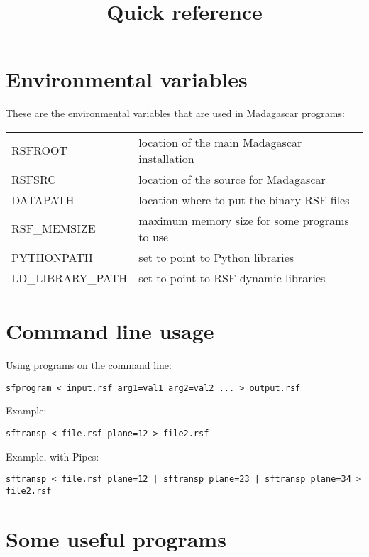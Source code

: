 \title{Quick reference}
\section{Environmental variables}

These are the environmental variables that are used in Madagascar programs:

\begin{tabular}{| l | l |}
    \hline
    RSFROOT & location of the main Madagascar installation \\
    RSFSRC & location of the source for Madagascar \\
    DATAPATH & location where to put the binary RSF files \\
    RSF\_MEMSIZE & maximum memory size for some programs to use \\
    PYTHONPATH & set to point to Python libraries \\
    LD\_LIBRARY\_PATH & set to point to RSF dynamic libraries \\
    \hline
\end{tabular}

\section{Command line usage}

Using programs on the command line:
\begin{verbatim}
sfprogram < input.rsf arg1=val1 arg2=val2 ... > output.rsf
\end{verbatim}
Example:
\begin{verbatim}
sftransp < file.rsf plane=12 > file2.rsf
\end{verbatim}
Example, with Pipes:
\begin{verbatim}
sftransp < file.rsf plane=12 | sftransp plane=23 | sftransp plane=34 > file2.rsf
\end{verbatim}

\section{Some useful programs}

